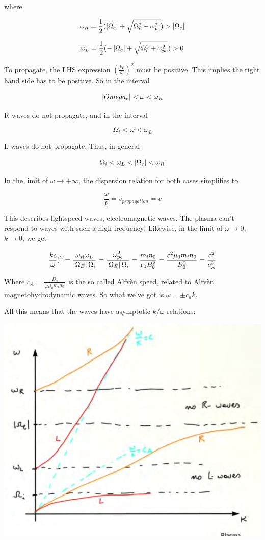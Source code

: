 \documentclass[PlasmaNotes.tex]{subfiles}
\begin{document}
where

\[ \omega_R = \frac{1}{2} (\left| \Omega_e \right|  + \sqrt{\Omega_e^2 + \omega_{pe}^2} ) > \left| \Omega_e \right| \]

\[ \omega_L = \frac{1}{2} (-\left| \Omega_e \right|  + \sqrt{\Omega_e^2 + \omega_{pe}^2} ) > 0 \]

To propagate, the LHS expression $(\frac{k c}{\omega})^2$ must be positive. This implies the right hand side has to be positive. So in the interval

\[ \left| Omega_e \right| < \omega < \omega_R \]

R-waves do not propagate, and in the interval

\[ \Omega_i < \omega < \omega_L \]

L-waves do not propagate. Thus, in general

\[ \Omega_i < \omega_L < \left| \Omega_e \right| < \omega_R \]

In the limit of $\omega \rightarrow +\infty$, the dispersion relation for both cases simplifies to

\[ \frac{\omega}{k} = v_{propagation} = c \]

This describes lightspeed waves, electromagnetic waves. The plasma can't respond to waves with such a high frequency! Likewise, in the limit of $\omega \rightarrow 0$, $k\rightarrow 0$, we get

\[ \frac{k c}{\omega})^2 = \frac{\omega_R \omega_L}{\left| \Omega_E \right| \Omega_i} = \frac{\omega_{pe}^2}{\left| \Omega_E \right| \Omega_i} = \frac{m_i n_0}{\epsilon_0 B_0^2} = \frac{c^2 \mu_0 m_i n_0}{B_0^2} = \frac{c^2}{c_A^2} \]

Where $c_A = \frac{B_0}{\sqrt{\mu_0 m_i n_0}}$ is the so called Alfvèn speed, related to Alfvèn magnetohydrodynamic waves. So what we've got is $\omega = \pm c_a k$.

All this means that the waves have asymptotic $k/\omega$ relations:

\includegraphics[width=\linewidth]{leftrightfrequencies}
\end{document}
